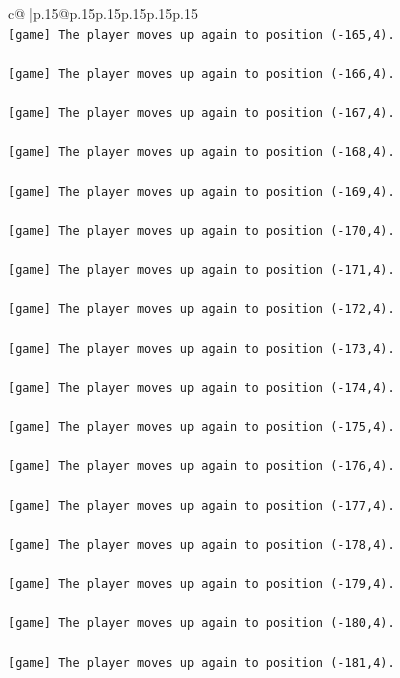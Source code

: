 \documentclass{article}
\begin{document}
{\begin{supertabular}{c@{$\;$}|p{.15\linewidth}@{}p{.15\linewidth}p{.15\linewidth}p{.15\linewidth}p{.15\linewidth}p{.15\linewidth}}
{{{\\ 
\texttt{{[}game{]} The player moves up again to position ({-}165,4).} \\
\\ 
\texttt{{[}game{]} The player moves up again to position ({-}166,4).} \\
\\ 
\texttt{{[}game{]} The player moves up again to position ({-}167,4).} \\
\\ 
\texttt{{[}game{]} The player moves up again to position ({-}168,4).} \\
\\ 
\texttt{{[}game{]} The player moves up again to position ({-}169,4).} \\
\\ 
\texttt{{[}game{]} The player moves up again to position ({-}170,4).} \\
\\ 
\texttt{{[}game{]} The player moves up again to position ({-}171,4).} \\
\\ 
\texttt{{[}game{]} The player moves up again to position ({-}172,4).} \\
\\ 
\texttt{{[}game{]} The player moves up again to position ({-}173,4).} \\
\\ 
\texttt{{[}game{]} The player moves up again to position ({-}174,4).} \\
\\ 
\texttt{{[}game{]} The player moves up again to position ({-}175,4).} \\
\\ 
\texttt{{[}game{]} The player moves up again to position ({-}176,4).} \\
\\ 
\texttt{{[}game{]} The player moves up again to position ({-}177,4).} \\
\\ 
\texttt{{[}game{]} The player moves up again to position ({-}178,4).} \\
\\ 
\texttt{{[}game{]} The player moves up again to position ({-}179,4).} \\
\\ 
\texttt{{[}game{]} The player moves up again to position ({-}180,4).} \\
\\ 
\texttt{{[}game{]} The player moves up again to position ({-}181,4).} \\
}}}
\end{supertabular}}
\end{document}
